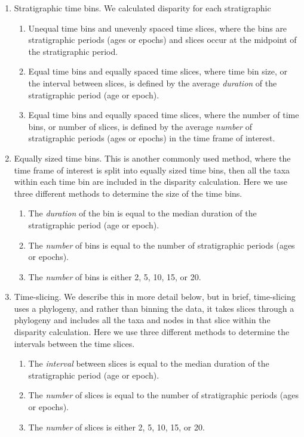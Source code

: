 \documentclass[12pt,a4paper]{article}
\begin{document}
\begin{enumerate}
\begin{enumerate}
  \item Stratigraphic time bins. We calculated disparity for each stratigraphic 
\begin{enumerate}
  \item Unequal time bins and unevenly spaced time slices, where the bins are stratigraphic periods (ages or epochs) and slices occur at the midpoint of the stratigraphic period.
  \item Equal time bins and equally spaced time slices, where time bin size, or the interval between slices, is defined by the average \textit{duration} of the stratigraphic period (age or epoch).
  \item Equal time bins and equally spaced time slices, where the number of time bins, or number of slices, is defined by the average \textit{number} of stratigraphic periods (ages or epochs) in the time frame of interest.
\end{enumerate}



  \item Equally sized time bins. This is another commonly used method, where the time frame of interest is split into equally sized time bins, then all the taxa within each time bin are included in the disparity calculation. Here we use three different methods to determine the size of the time bins. 
    \begin{enumerate}
      \item The \textit{duration} of the bin is equal to the median duration of the stratigraphic period (age or epoch).
      \item The \textit{number} of bins is equal to the number of stratigraphic periods (ages or epochs).
      \item The \textit{number} of bins is either 2, 5, 10, 15, or 20.
    \end{enumerate}
  \item Time-slicing. We describe this in more detail below, but in brief, time-slicing uses a phylogeny, and rather than binning the data, it takes slices through a phylogeny and includes all the taxa and nodes in that slice within the disparity calculation. Here we use three different methods to determine the intervals between the time slices.
    \begin{enumerate}
      \item The \textit{interval} between slices is equal to the median duration of the stratigraphic period (age or epoch).
      \item The \textit{number} of slices is equal to the number of stratigraphic periods (ages or epochs).
      \item The \textit{number} of slices is either 2, 5, 10, 15, or 20.
    \end{enumerate} 



\end{enumerate}
\end{enumerate}
\end{document}
